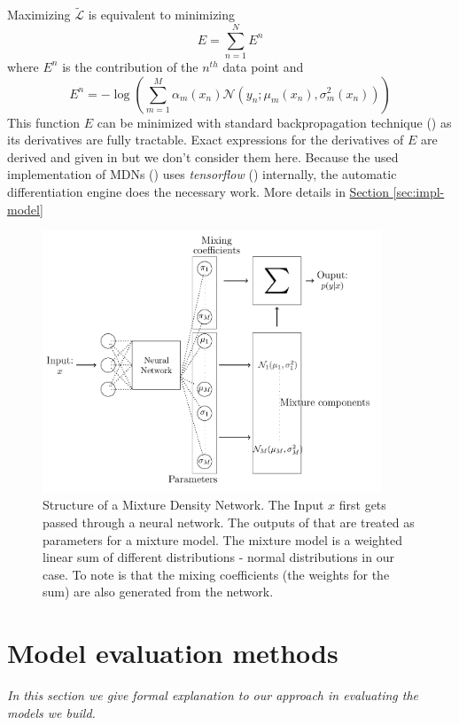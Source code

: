 \documentclass[12pt,a4paper,twoside]{scrartcl}
\numberwithin{equation}{section}
\newcommand{\refsec}[1]{\hyperref[#1]{Section \ref*{#1}}}
\begin{document}
Maximizing \(\tilde{\mathcal{L}}\) is equivalent to minimizing
\begin{equation}
  \label{eq:log-like-sum-1}
  E = \sum_{n=1}^NE^n
\end{equation}
where \(E^n\) is the contribution of the \(n^{th}\) data point and
\begin{equation}
  \label{eq:log-like-sum-2}
  E^n = -\log(\sum_{m=1}^M \alpha_m(x_n)\mathcal{N}(y_n; \mu_m(x_n), \sigma_m^2(x_n)))
\end{equation}
This function \(E\) can be minimized with standard backpropagation technique (\cite{bertels2001}) as its derivatives are fully tractable. Exact expressions for the derivatives of \(E\) are derived and given in \cite{bishop1994} but we don't consider them here. Because the used implementation of MDNs (\cite{gpflow}) uses \emph{tensorflow} (\cite{tf}) internally, the automatic differentiation engine does the necessary work. More details in \refsec{sec:impl-model}
\begin{center}
  \begin{figure}[htbp]
    \label{fig:mdn}
    \centering
    \includegraphics[height=0.6\textwidth, width=0.9\textwidth]{figures/mdn.png}
    \caption[Mixture Density Network Architecture]{Structure of a Mixture Density Network. The Input \(x\) first gets passed through a neural network. The outputs of that are treated as parameters for a mixture model. The mixture model is a weighted linear sum of different distributions - normal distributions in our case. To note is that the mixing coefficients (the weights for the sum) are also generated from the network.}
  \end{figure}
\end{center}  
\section{Model evaluation methods}\label{sec:criticism}
\noindent\emph{In this section we give formal explanation to our approach in evaluating the models we build.}
\end{document}
